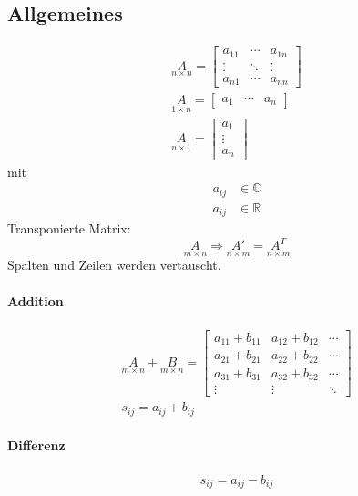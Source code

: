 \subsection{Allgemeines}
\begin{gather}
  \underset{n\times n}{A} = \begin{bmatrix}
	a_{11} & \cdots & a_{1n} \\
	\vdots & \ddots & \vdots \\
	a_{n1} & \cdots & a_{nn}
  \end{bmatrix} \\
  \underset{1\times n}{A} = \begin{bmatrix}
	a_1 & \cdots & a_n
  \end{bmatrix} \\
  \underset{n\times 1}{A} = \begin{bmatrix}
	a_1 \\
	\vdots \\
	a_n
  \end{bmatrix}
\end{gather}
mit
\begin{align*}
a_{ij} &\in \mathbb{C} \\
a_{ij} &\in \mathbb{R}
\end{align*}
Transponierte Matrix:
\begin{equation}
  \underset{m\times n}{A} \Rightarrow \underset{n\times m}{A'} = \underset{n\times m}{A^T}
\end{equation}
Spalten und Zeilen werden vertauscht. \\

\paragraph{Addition}
\begin{gather}
  \underset{m\times n}{A} + \underset{m\times n}{B} = \begin{bmatrix}
	a_{11} + b_{11} & a_{12} + b_{12} & \cdots \\
	a_{21} + b_{21} & a_{22} + b_{22} & \cdots \\
	a_{31} + b_{31} & a_{32} + b_{32} & \cdots \\
	\vdots & \vdots & \ddots
  \end{bmatrix} \\
  s_{ij} = a_{ij} + b_{ij}
\end{gather}

\paragraph{Differenz}
\begin{gather}
  s_{ij} = a_{ij} - b_{ij}
\end{gather}


